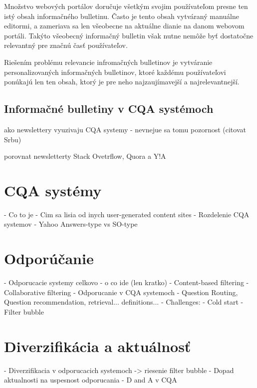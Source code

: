 Množstvo webových portálov doručuje všetkým svojim používateľom presne ten istý obsah informačného bulletinu.
Často je tento obsah vytváraný manuálne editormi, a zameriava sa len všeobecne na aktuálne dianie na danom webovom
portáli. Takýto všeobecný informačný bulletin však nutne nemôže byť dostatočne relevantný pre značnú časť používateľov.

Riešením problému relevancie infromačných bulletinov je vytváranie personalizovaných informačných bulletinov, ktoré
každému používateľovi ponúkajú len ten obsah, ktorý je pre neho najzaujímavejší a najrelevantnejší.


\section{Informačné bulletiny v CQA systémoch}

ako newslettery vyuzivaju CQA systemy - nevnejue sa tomu pozornost (citovat Srbu)

porovnat newsletterty Stack Ovetrflow, Quora a Y!A





\newpage
\chapter{CQA systémy}

    - Co to je
    - Cim sa lisia od inych user-generated content sites
    - Rozdelenie CQA systemov - Yahoo Answers-type vs SO-type





\chapter{Odporúčanie}

- Odporucacie systemy celkovo - o co ide (len kratko)
    - Content-based filtering
    - Collaborative filtering
- Odporucanie v CQA systemoch
- Question Routing, Question recommendation, retrieval... definitions...
- Challenges:
    - Cold start
    - Filter bubble





\chapter{Diverzifikácia a aktuálnosť}

- Diverzifikacia v odporucacich systemoch -> riesenie filter bubble
- Dopad aktualnosti na uspesnost odporucania
- D and A v CQA

